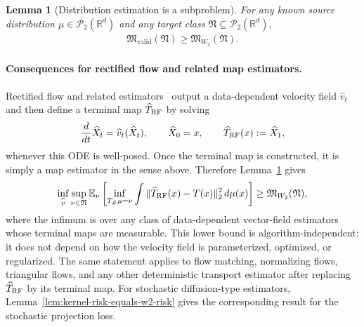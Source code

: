 \documentclass[11pt,twoside]{article}
\newtheorem{lemma}{Lemma}
\newcommand{\targetclass}{\mathfrak{N}}
\newcommand{\validminimaxrisk}{\mathfrak{M}_{\text{valid}}}
\newcommand{\wtwominimaxrisk}{\mathfrak M_{W_2}}
\begin{document}
\begin{lemma}[Distribution estimation is a subproblem]
\label{lem:wasserstein-lower-bound-valid map}
For any known source distribution $\mu\in\mathcal P_2(\mathbb R^d)$ and any target class $\targetclass\subseteq\mathcal P_2(\mathbb R^d)$,
\begin{align}
\label{eq:valid map-lower-bound-by-w2}
\validminimaxrisk(\targetclass)
\geq
\wtwominimaxrisk(\targetclass).
\end{align}
\end{lemma}

\paragraph{Consequences for rectified flow and related map estimators.}
Rectified flow and related estimators~\cite{lipman2023flowmatching,liu2022rectified,albergo2023stochastic}
output a data-dependent velocity field $\widehat v_t$ and then define a terminal map $\widehat T_{\rm RF}$ by solving
\begin{align*}
\frac{d}{dt}\widehat X_t = \widehat v_t(\widehat X_t),
\qquad
\widehat X_0=x,
\qquad
\widehat T_{\rm RF}(x):=\widehat X_1,
\end{align*}
whenever this ODE is well-posed. Once the terminal map is constructed, it is simply a map estimator in the sense above. Therefore Lemma~\ref{lem:wasserstein-lower-bound-valid map} gives
\begin{align}
\label{eq:rf-lower-bound-general}
\inf_{\widehat v}
\sup_{\nu\in\targetclass}
\mathbb E_\nu
\left[
\inf_{T_\#\mu=\nu}
\int \|\widehat T_{\rm RF}(x)-T(x)\|_2^2\,d\mu(x)
\right]
\geq
\wtwominimaxrisk(\targetclass),
\end{align}
where the infimum is over any class of data-dependent vector-field estimators whose terminal maps are measurable. This lower bound is algorithm-independent: it does not depend on how the velocity field is parameterized, optimized, or regularized. The same statement applies to flow matching, normalizing flows, triangular flows, and any other deterministic transport estimator after replacing $\widehat T_{\rm RF}$ by its terminal map. For stochastic diffusion-type estimators, Lemma~\ref{lem:kernel-risk-equals-w2-risk} gives the corresponding result for the stochastic projection loss. 
\end{document}
